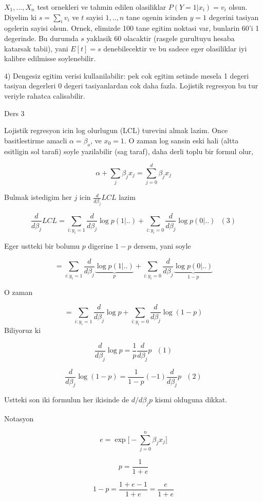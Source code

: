\documentclass[12pt,fleqn]{article}\usepackage{../common}
\begin{document}
$X_1,...,X_n$ test ornekleri ve tahmin edilen olasiliklar $P(Y=1 | x_i) =
v_i$
olsun. Diyelim ki $s = \sum_i v_i$ ve $t$ sayisi $1,..,n$ tane ogenin
icinden $y = 1$ degerini tasiyan ogelerin sayisi olsun. Ornek, elimizde 100
tane egitim noktasi var, bunlarin 60'i 1 degerinde. Bu durumda $s$ yaklasik
60 olacaktir (rasgele gurultuyu hesaba katarsak tabii), yani  $E[t] =
s$ 
denebilecektir ve bu sadece eger olasiliklar iyi kalibre edilmisse
soylenebilir.

4) Dengesiz egitim verisi kullanilabilir: pek cok egitim setinde mesela 1
degeri tasiyan degerleri 0 degeri tasiyanlardan cok daha fazla. Lojistik
regresyon bu tur veriyle rahatca calisabilir.
 
Ders 3

Lojistik regresyon icin log olurlugun (LCL) turevini almak lazim. Once
basitlestirme amacli $\alpha = \beta_o$, ve $x_0 = 1$. O zaman log sansin
eski hali (altta esitligin sol tarafi) soyle yazilabilir (sag taraf), daha
derli toplu bir formul olur,

$$ \alpha + \sum_j \beta_j x_j  = \sum_{j=0}^{d} \beta_j x_j $$ 

Bulmak istedigim her $j$ icin $\frac{d}{d\beta_j} LCL$ lazim

$$ 
\frac{d}{d\beta_j} LCL = 
\sum _{i:y_i=1} \frac{d}{d\beta_j} \log p(1|..)
+ \sum _{i:y_i=0} \frac{d}{d\beta_j} \log p(0|..)
\ \ \ (3)
$$

Eger ustteki bir bolumu $p$ digerine $1-p$ dersem, yani soyle

$$ 
= \sum _{i:y_i=1} \frac{d}{d\beta_j} \underbrace{\log p(1|..)}_{p}
+ \sum _{i:y_i=0} \frac{d}{d\beta_j} \underbrace{\log p(0|..)}_{1-p}
$$

O zaman 


$$ 
= \sum _{i:y_i=1} \frac{d}{d\beta_j}\log p
+ \sum _{i:y_i=0} \frac{d}{d\beta_j} \log (1-p)
$$
Biliyoruz ki

$$ 
\frac{d}{d\beta_j}\log p = \frac{1}{p}\frac{d}{d\beta_j} p
\ \ \ (1)
$$

$$ 
\frac{d}{d\beta_j}\log (1-p) = \frac{1}{1-p}(-1)\frac{d}{d\beta_j} p
\ \ \ (2)
$$

Ustteki son iki formulun her ikisinde de $d/d\beta_j p$ kismi olduguna dikkat.

Notasyon

$$ e = \exp \big[ - \sum_{j=0}^n \beta_jx_j \big] $$

$$ p = \frac{ 1}{1+e} $$

$$ 1-p = \frac{ 1+e-1}{1+e} = \frac{ e}{1+e} $$
\end{document}
